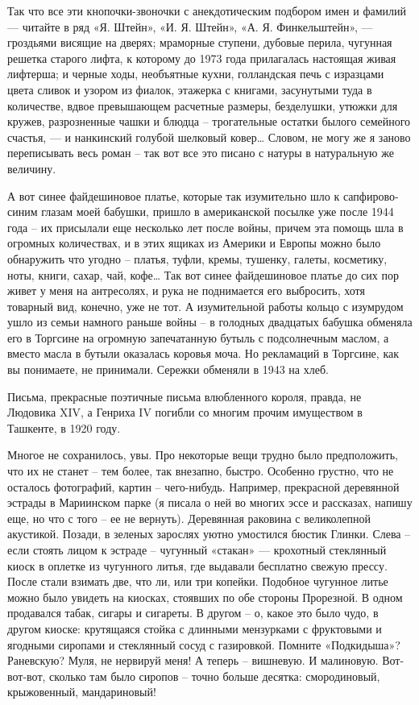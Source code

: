 Так что все эти кнопочки-звоночки с анекдотическим подбором имен и фамилий —
читайте в ряд «Я. Штейн», «И. Я. Штейн», «А. Я. Финкельштейн», — гроздьями
висящие на дверях; мраморные ступени, дубовые перила, чугунная решетка старого
лифта, к которому до 1973 года прилагалась настоящая живая лифтерша; и черные
ходы, необъятные кухни, голландская печь с изразцами цвета сливок и узором из
фиалок, этажерка с книгами, засунутыми туда в количестве, вдвое превышающем
расчетные размеры, безделушки, утюжки для кружев, разрозненные чашки и блюдца –
трогательные остатки былого семейного счастья, — и нанкинский голубой шелковый
ковер… Словом, не могу же я заново переписывать весь роман – так вот все это
писано с натуры в натуральную же величину.

А вот синее файдешиновое платье, которые так изумительно шло к сапфирово-синим
глазам моей бабушки, пришло в американской посылке уже после 1944 года – их
присылали еще несколько лет после войны, причем эта помощь шла в огромных
количествах, и в этих ящиках из Америки и Европы можно было обнаружить что
угодно – платья, туфли, кремы, тушенку, галеты, косметику, ноты, книги, сахар,
чай, кофе… Так вот синее файдешиновое платье до сих пор живет у меня на
антресолях, и рука не поднимается его выбросить, хотя товарный вид, конечно,
уже не тот. А изумительной работы кольцо с изумрудом ушло из семьи намного
раньше войны – в голодных двадцатых бабушка обменяла его в Торгсине на огромную
запечатанную бутыль с подсолнечным маслом, а вместо масла в бутыли оказалась
коровья моча. Но рекламаций в Торгсине, как вы понимаете, не принимали. Сережки
обменяли в 1943 на хлеб.

Письма, прекрасные поэтичные письма влюбленного короля, правда, не Людовика
XIV, а Генриха IV погибли со многим прочим имуществом в Ташкенте, в 1920 году.

Многое не сохранилось, увы. Про некоторые вещи трудно было предположить, что их
не станет – тем более, так внезапно, быстро. Особенно грустно, что не осталось
фотографий, картин – чего-нибудь. Например, прекрасной деревянной эстрады в
Мариинском парке (я писала о ней во многих эссе и рассказах, напишу еще, но что
с того – ее не вернуть). Деревянная раковина с великолепной акустикой. Позади,
в зеленых зарослях уютно умостился бюстик Глинки. Слева – если стоять лицом к
эстраде – чугунный «стакан» — крохотный стеклянный киоск в оплетке из чугунного
литья, где выдавали бесплатно свежую прессу. После стали взимать две, что ли,
или три копейки. Подобное чугунное литье можно было увидеть на киосках,
стоявших по обе стороны Прорезной. В одном продавался табак, сигары и сигареты.
В другом – о, какое это было чудо, в другом киоске: крутящаяся стойка с
длинными мензурками с фруктовыми и ягодными сиропами и стеклянный сосуд с
газировкой. Помните «Подкидыша»? Раневскую? Муля, не нервируй меня! А теперь –
вишневую. И малиновую. Вот-вот-вот, сколько там было сиропов – точно больше
десятка: смородиновый, крыжовенный, мандариновый!

